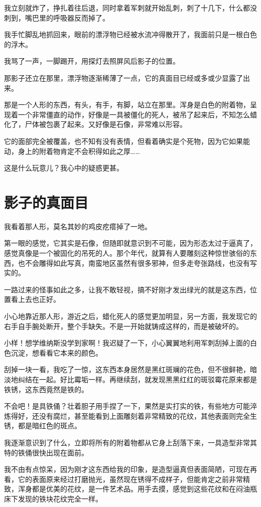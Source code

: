 我立刻就炸了，挣扎着往后退，同时拿着军刺就开始乱刺，刺了十几下，什么都没刺到，嘴巴里的呼吸器反而掉了。

我手忙脚乱地抓回来，眼前的漂浮物已经被水流冲得散开了，我面前只是一根白色的浮木。

我骂了一声，一脚踢开，用探灯去照屏风后影子的位置。

那影子还立在那里，漂浮物逐渐稀薄了一点，它的真面目已经或多或少显露了出来。

那是一个人形的东西，有头，有手，有脚，站立在那里。浑身是白色的附着物，呈现着一个非常僵直的动作，好像是一具被僵化的死人，被吊了起来后，不知怎么蜡化了，尸体被包裹了起来。又好像是石像，非常难以形容。

它的面部完全被覆盖，也不知有没有表情，但看着确实是个死物，因为它如果能动，身上的附着物肯定不会积得如此之厚……

这是什么玩意儿？我心中的疑惑更甚。

\chapter{影子的真面目}

我看着那人形，莫名其妙的鸡皮疙瘩掉了一地。

第一眼的感觉，它其实是石像，但随即就意识到不可能，因为形态太过于逼真了，感觉真像是一个被固化的吊死的人。那个年代，就算有人要雕刻这种惊世骇俗的东西，也不会雕得如此写真，南蛮地区虽然有很多邪神，但多走夸张路线，也没有写实的。

一路过来的怪事如此之多，让我不敢轻视，搞不好刚才发出绿光的就是这东西，位置看上去也正好。

小心地靠近那人形，游近之后，蜡化死人的感觉更加明显，另一方面，我发现它的右手自手腕处断开，整个手缺失。不是一开始就铸成这样的，而是被破坏的。

小样！想学维纳斯没学到家啊！我迟疑了一下，小心翼翼地利用军刺刮掉上面的白色沉淀，想看看它本来的颜色。

刮掉一块一看，我吃了一惊，这东西本身居然是黑红斑斓的花色，但不很鲜艳，暗淡地纠结在一起。好比霉垢一样。再继续刮，就发现黑黑红红的斑驳霉花原来都是铁锈，这东西竟然是铁的。

不会吧！是具铁俑？壮着胆子用手捏了一下，果然是实打实的铁，有些地方可能淬炼得好，还没有腐烂，甚至能看到上面雕刻着非常精致的花纹，其他表面则完全生锈，都是暗红色的斑点。

我逐渐意识到了什么，立即将所有的附着物都从它身上刮落下来，一具造型非常其特的铁俑很快出现在面前。

我不由有点惊呆，因为刚才这东西给我的印象，是造型逼真但表面简陋，可现在再看，它的表面原来经过打磨抛光，虽然现在锈得不成样子，但能肯定之前非常精致，浑身都是优美的花纹，是一件艺术品。用手去摸，感觉到这些花纹和在闷油瓶床下发现的铁块花纹完全一样。

